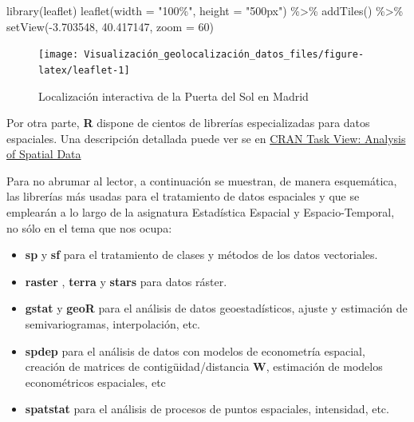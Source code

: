 \documentclass[
]{book}
\newenvironment{Shaded}{\begin{snugshade}}{\end{snugshade}}
\newcommand{\AttributeTok}[1]{\textcolor[rgb]{0.77,0.63,0.00}{#1}}
\newcommand{\DecValTok}[1]{\textcolor[rgb]{0.00,0.00,0.81}{#1}}
\newcommand{\FloatTok}[1]{\textcolor[rgb]{0.00,0.00,0.81}{#1}}
\newcommand{\FunctionTok}[1]{\textcolor[rgb]{0.00,0.00,0.00}{#1}}
\newcommand{\NormalTok}[1]{#1}
\newcommand{\SpecialCharTok}[1]{\textcolor[rgb]{0.00,0.00,0.00}{#1}}
\newcommand{\StringTok}[1]{\textcolor[rgb]{0.31,0.60,0.02}{#1}}
\theoremstyle{definition}
\theoremstyle{definition}
\theoremstyle{definition}
\theoremstyle{definition}
\theoremstyle{remark}
\begin{document}
\begin{Shaded}
\begin{Highlighting}[]
\FunctionTok{library}\NormalTok{(leaflet)}
\FunctionTok{leaflet}\NormalTok{(}\AttributeTok{width =} \StringTok{"100\%"}\NormalTok{, }\AttributeTok{height =} \StringTok{"500px"}\NormalTok{) }\SpecialCharTok{\%\textgreater{}\%}
  \FunctionTok{addTiles}\NormalTok{() }\SpecialCharTok{\%\textgreater{}\%}
  \FunctionTok{setView}\NormalTok{(}\SpecialCharTok{{-}}\FloatTok{3.703548}\NormalTok{, }\FloatTok{40.417147}\NormalTok{, }\AttributeTok{zoom =} \DecValTok{60}\NormalTok{)}
\end{Highlighting}
\end{Shaded}

\begin{figure}

{\centering \texttt{[image: Visualización\_geolocalización\_datos\_files/figure-latex/leaflet-1]} 

}

\caption{Localización interactiva de la Puerta del Sol en Madrid}\label{fig:leaflet}
\end{figure}

Por otra parte, \textbf{R} dispone de cientos de librerías especializadas para datos
espaciales. Una descripción detallada puede ver se en \href{https://cran.r-project.org/web/views/Spatial.html}{CRAN Task View: Analysis
of Spatial Data}

Para no abrumar al lector, a continuación se muestran, de manera esquemática,
las librerías más usadas para el tratamiento de datos espaciales y que se
emplearán a lo largo de la asignatura Estadística Espacial y Espacio-Temporal,
no sólo en el tema que nos ocupa:

\begin{itemize}
\item
  \textbf{sp} \citep{R-sp} y \textbf{sf} \citep{R-sp} para el tratamiento de clases y métodos de
  los datos vectoriales.
\item
  \textbf{raster} \citep{R-raster}, \textbf{terra} \citep{R-terra}y \textbf{stars} \citep{R-stars} para
  datos ráster.
\item
  \textbf{gstat} \citep{R-gstat} y \textbf{geoR} \citep{R-geor} para el análisis de datos
  geoestadísticos, ajuste y estimación de semivariogramas, interpolación, etc.
\item
  \textbf{spdep} \citep{R-spdep} para el análisis de datos con modelos de econometría
  espacial, creación de matrices de contigüidad/distancia \textbf{W}, estimación de
  modelos econométricos espaciales, etc
\item
  \textbf{spatstat} \citep{spatstat_2005} para el análisis de procesos de puntos
  espaciales, intensidad, etc.
\end{itemize}
\end{document}
